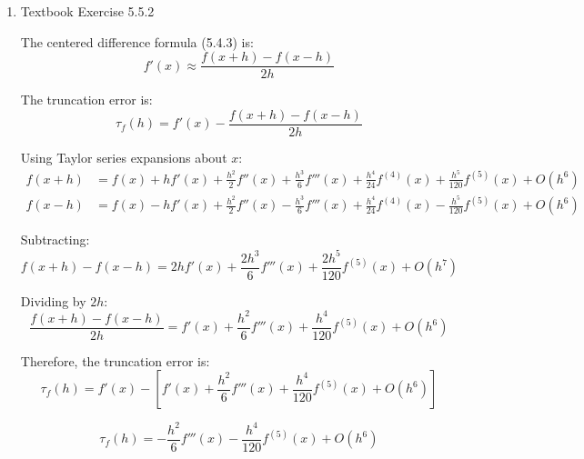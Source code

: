 \documentclass[reqno, answers]{exam}
\begin{document}
\begin{enumerate}
\begin{solution}
Therefore, the centered formula converges to equality as $h \to 0$.

\textbf{(b)} Consider the general finite-difference formula:
$$f'(x) \approx \frac{1}{h}\sum_{k=-p}^{q} a_k f(x+kh)$$

For convergence as $h \to 0$, we need:
$$\lim_{h \to 0} \frac{\sum_{k=-p}^{q} a_k f(x+kh)}{h} = f'(x)$$

\textbf{Condition 1:} For the indeterminate form $\frac{0}{0}$ to occur (so L'Hôpital's Rule can be applied), the numerator must approach 0:
$$\lim_{h \to 0} \sum_{k=-p}^{q} a_k f(x+kh) = \sum_{k=-p}^{q} a_k f(x) = 0$$

This requires:
$$\boxed{\sum_{k=-p}^{q} a_k = 0}$$

\textbf{Condition 2:} Applying L'Hôpital's Rule:
$$\lim_{h \to 0} \frac{\sum_{k=-p}^{q} a_k f(x+kh)}{h} = \lim_{h \to 0} \frac{\sum_{k=-p}^{q} a_k \cdot k \cdot f'(x+kh)}{1} = f'(x) \sum_{k=-p}^{q} k a_k$$

For this to equal $f'(x)$:
$$\boxed{\sum_{k=-p}^{q} k a_k = 1}$$
\end{solution}

\item Textbook Exercise 5.5.2

\begin{solution}
The centered difference formula (5.4.3) is:
$$f'(x) \approx \frac{f(x+h) - f(x-h)}{2h}$$

The truncation error is:
$$\tau_f(h) = f'(x) - \frac{f(x+h) - f(x-h)}{2h}$$

Using Taylor series expansions about $x$:
\begin{align*}
f(x+h) &= f(x) + hf'(x) + \frac{h^2}{2}f''(x) + \frac{h^3}{6}f'''(x) + \frac{h^4}{24}f^{(4)}(x) + \frac{h^5}{120}f^{(5)}(x) + O(h^6)\\
f(x-h) &= f(x) - hf'(x) + \frac{h^2}{2}f''(x) - \frac{h^3}{6}f'''(x) + \frac{h^4}{24}f^{(4)}(x) - \frac{h^5}{120}f^{(5)}(x) + O(h^6)
\end{align*}

Subtracting:
$$f(x+h) - f(x-h) = 2hf'(x) + \frac{2h^3}{6}f'''(x) + \frac{2h^5}{120}f^{(5)}(x) + O(h^7)$$

Dividing by $2h$:
$$\frac{f(x+h) - f(x-h)}{2h} = f'(x) + \frac{h^2}{6}f'''(x) + \frac{h^4}{120}f^{(5)}(x) + O(h^6)$$

Therefore, the truncation error is:
$$\tau_f(h) = f'(x) - \left[f'(x) + \frac{h^2}{6}f'''(x) + \frac{h^4}{120}f^{(5)}(x) + O(h^6)\right]$$

$$\boxed{\tau_f(h) = -\frac{h^2}{6}f'''(x) - \frac{h^4}{120}f^{(5)}(x) + O(h^6)}$$


\end{solution}
\end{enumerate}
\end{document}
